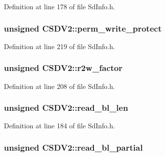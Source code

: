 Definition at line 178 of file Sd\+Info.\+h.

\subsubsection[{\texorpdfstring{perm\+\_\+write\+\_\+protect}{perm\_write\_protect}}]{\setlength{\rightskip}{0pt plus 5cm}unsigned C\+S\+D\+V2\+::perm\+\_\+write\+\_\+protect}\hypertarget{struct_c_s_d_v2_ae8a4cd07025c0192acc093cca8379d73}{}\label{struct_c_s_d_v2_ae8a4cd07025c0192acc093cca8379d73}


Definition at line 219 of file Sd\+Info.\+h.

\subsubsection[{\texorpdfstring{r2w\+\_\+factor}{r2w\_factor}}]{\setlength{\rightskip}{0pt plus 5cm}unsigned C\+S\+D\+V2\+::r2w\+\_\+factor}\hypertarget{struct_c_s_d_v2_a58bd5e31a21564370b5321ce744c53cf}{}\label{struct_c_s_d_v2_a58bd5e31a21564370b5321ce744c53cf}


Definition at line 208 of file Sd\+Info.\+h.

\subsubsection[{\texorpdfstring{read\+\_\+bl\+\_\+len}{read\_bl\_len}}]{\setlength{\rightskip}{0pt plus 5cm}unsigned C\+S\+D\+V2\+::read\+\_\+bl\+\_\+len}\hypertarget{struct_c_s_d_v2_a79cb233cef532dc1682e0ef11f7745dc}{}\label{struct_c_s_d_v2_a79cb233cef532dc1682e0ef11f7745dc}


Definition at line 184 of file Sd\+Info.\+h.

\subsubsection[{\texorpdfstring{read\+\_\+bl\+\_\+partial}{read\_bl\_partial}}]{\setlength{\rightskip}{0pt plus 5cm}unsigned C\+S\+D\+V2\+::read\+\_\+bl\+\_\+partial}\hypertarget{struct_c_s_d_v2_acb3ef2206ca2c6c5266c67b695509036}{}\label{struct_c_s_d_v2_acb3ef2206ca2c6c5266c67b695509036}


